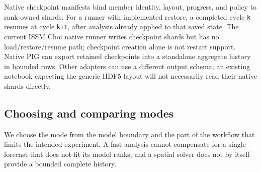 \documentclass[11pt,a4paper]{article}
\newcommand{\code}[1]{\nolinkurl{#1}}
\begin{document}
Native checkpoint manifests bind member identity, layout, progress, and policy to rank-owned shards. For a runner with implemented restore, a completed cycle \code{k} resumes at cycle \code{k+1}, after analysis already applied to that saved state. The current ISSM Choi native runner writes checkpoint shards but has no load/restore/resume path; checkpoint creation alone is not restart support. Native PIG can export retained checkpoints into a standalone aggregate history in bounded rows. Other adapters can use a different output schema; an existing notebook expecting the generic HDF5 layout will not necessarily read their native shards directly.

\subsection{Choosing and comparing modes}

We choose the mode from the model boundary and the part of the workflow that limits the intended experiment. A fast analysis cannot compensate for a single forecast that does not fit its model ranks, and a spatial solver does not by itself provide a bounded complete history.
\end{document}
